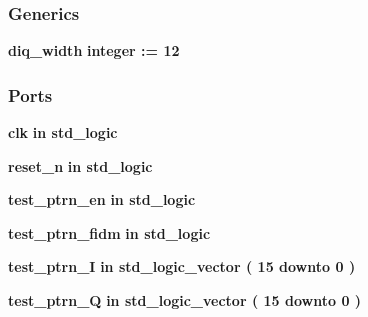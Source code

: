 \subsubsection*{Generics}
 \begin{DoxyCompactItemize}
\item 
{\bf diq\+\_\+width} {\bfseries {\bfseries \textcolor{comment}{integer}\textcolor{vhdlchar}{ }\textcolor{vhdlchar}{ }\textcolor{vhdlchar}{\+:}\textcolor{vhdlchar}{=}\textcolor{vhdlchar}{ }\textcolor{vhdlchar}{ } \textcolor{vhdldigit}{12} \textcolor{vhdlchar}{ }}}
\end{DoxyCompactItemize}
\subsubsection*{Ports}
 \begin{DoxyCompactItemize}
\item 
{\bf clk}  {\bfseries {\bfseries \textcolor{keywordflow}{in}\textcolor{vhdlchar}{ }}} {\bfseries \textcolor{comment}{std\+\_\+logic}\textcolor{vhdlchar}{ }} 
\item 
{\bf reset\+\_\+n}  {\bfseries {\bfseries \textcolor{keywordflow}{in}\textcolor{vhdlchar}{ }}} {\bfseries \textcolor{comment}{std\+\_\+logic}\textcolor{vhdlchar}{ }} 
\item 
{\bf test\+\_\+ptrn\+\_\+en}  {\bfseries {\bfseries \textcolor{keywordflow}{in}\textcolor{vhdlchar}{ }}} {\bfseries \textcolor{comment}{std\+\_\+logic}\textcolor{vhdlchar}{ }} 
\item 
{\bf test\+\_\+ptrn\+\_\+fidm}  {\bfseries {\bfseries \textcolor{keywordflow}{in}\textcolor{vhdlchar}{ }}} {\bfseries \textcolor{comment}{std\+\_\+logic}\textcolor{vhdlchar}{ }} 
\item 
{\bf test\+\_\+ptrn\+\_\+I}  {\bfseries {\bfseries \textcolor{keywordflow}{in}\textcolor{vhdlchar}{ }}} {\bfseries \textcolor{comment}{std\+\_\+logic\+\_\+vector}\textcolor{vhdlchar}{ }\textcolor{vhdlchar}{(}\textcolor{vhdlchar}{ }\textcolor{vhdlchar}{ } \textcolor{vhdldigit}{15} \textcolor{vhdlchar}{ }\textcolor{keywordflow}{downto}\textcolor{vhdlchar}{ }\textcolor{vhdlchar}{ } \textcolor{vhdldigit}{0} \textcolor{vhdlchar}{ }\textcolor{vhdlchar}{)}\textcolor{vhdlchar}{ }} 
\item 
{\bf test\+\_\+ptrn\+\_\+Q}  {\bfseries {\bfseries \textcolor{keywordflow}{in}\textcolor{vhdlchar}{ }}} {\bfseries \textcolor{comment}{std\+\_\+logic\+\_\+vector}\textcolor{vhdlchar}{ }\textcolor{vhdlchar}{(}\textcolor{vhdlchar}{ }\textcolor{vhdlchar}{ } \textcolor{vhdldigit}{15} \textcolor{vhdlchar}{ }\textcolor{keywordflow}{downto}\textcolor{vhdlchar}{ }\textcolor{vhdlchar}{ } \textcolor{vhdldigit}{0} \textcolor{vhdlchar}{ }\textcolor{vhdlchar}{)}\textcolor{vhdlchar}{ }} 

\end{DoxyCompactItemize}
